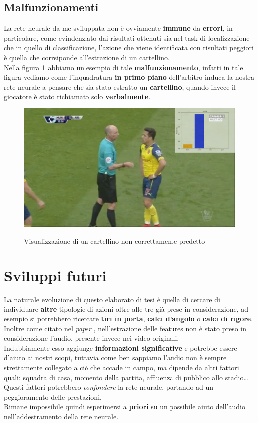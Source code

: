 \subsection{Malfunzionamenti}
La rete neurale da me sviluppata non è ovviamente \textbf{immune} da \textbf{errori}, in particolare, come evindenziato dai risultati ottenuti sia nel task di localizzazione che in quello di classificazione, l'azione che viene identificata con risultati peggiori è quella che corrsiponde all'estrazione di un cartellino.
\\Nella figura \textbf{\ref{figure : fakecard}} abbiamo un esempio di tale \textbf{malfunzionamento}, infatti in tale figura vediamo come l'inquadratura \textbf{in primo piano} dell'arbitro induca la nostra rete neurale a pensare che sia stato estratto un \textbf{cartellino}, quando invece il giocatore è stato richiamato solo \textbf{verbalmente}.
\begin{figure}[H]
\centering
\caption{Visualizzazione di un cartellino non correttamente predetto}
\includegraphics[width=\linewidth]{img/fakecard.png}
\label{figure : fakecard}
\end{figure}
\section{Sviluppi futuri}
La naturale evoluzione di questo elaborato di tesi è quella di cercare di individuare \textbf{altre} tipologie di azioni oltre alle tre già prese in considerazione, ad esempio si potrebbero ricercare \textbf{tiri in porta}, \textbf{calci d'angolo} o \textbf{calci di rigore}.
\\Inoltre come citato nel \textit{paper} \citep{soccerNet}, nell'estrazione delle features non è stato preso in considerazione l'audio, presente invece nei video originali.
\\Indubbiamente esso aggiunge \textbf{informazioni significative} e potrebbe essere d'aiuto ai nostri scopi, tuttavia come ben sappiamo l'audio non è sempre strettamente collegato a ciò che accade in campo, ma dipende da altri fattori quali: squadra di casa, momento della partita, affluenza di pubblico allo stadio\ldots
\\Questi fattori potrebbero \textit{confondere} la rete neurale, portando ad un peggioramento delle prestazioni.
\\Rimane impossibile quindi esperimersi a \textbf{priori} su un possibile aiuto dell'audio nell'addestramento della rete neurale.
